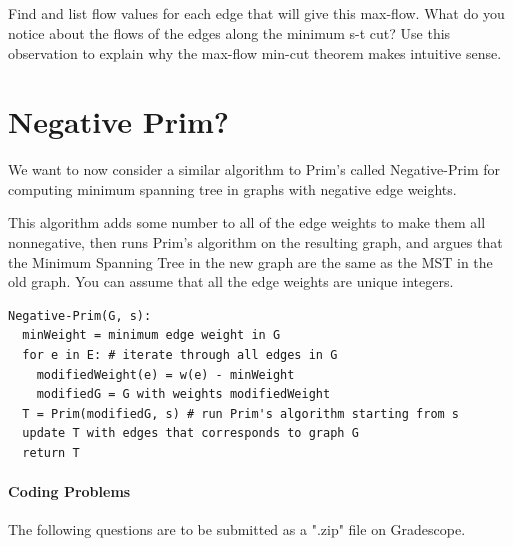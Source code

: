 \documentclass [12pt]{article}
\begin{document}


\subsection{}

Find and list flow values for each edge that will give this max-flow. What do you notice about the flows of the edges along the minimum s-t cut? Use this observation to explain why the max-flow min-cut theorem makes intuitive sense.



\pagebreak
\section{Negative Prim? }
\label{sec:last}
We want to now consider a similar algorithm to Prim's called Negative-Prim for computing minimum spanning tree in graphs with negative edge weights.

This algorithm adds some number to all of the edge weights to make them all nonnegative, then runs Prim's algorithm on the resulting graph, and argues that the Minimum Spanning Tree in the new graph are the same as the MST in the old graph. You can assume that all the edge weights are unique integers.

\begin{verbatim}
Negative-Prim(G, s):
  minWeight = minimum edge weight in G
  for e in E: # iterate through all edges in G
    modifiedWeight(e) = w(e) - minWeight
    modifiedG = G with weights modifiedWeight
  T = Prim(modifiedG, s) # run Prim's algorithm starting from s
  update T with edges that corresponds to graph G
  return T
\end{verbatim}


\pagebreak
\begin{Instruction}

\paragraph{Coding Problems} The following questions are to be submitted as a ".zip" file on Gradescope. 

\end{Instruction}
\end{document}
